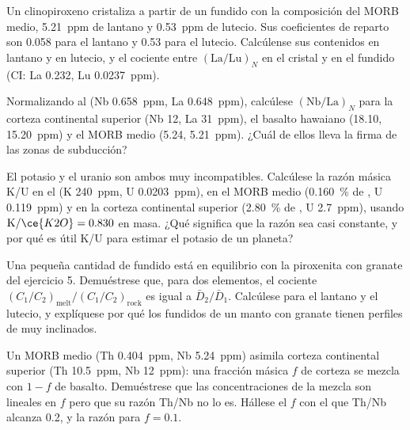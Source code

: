 \begin{exercise}[$\star\star$]\label{exo:b2:elements-in-the-earth:7}
Un clinopiroxeno cristaliza a partir de un fundido con la composición del MORB medio,
\qty{5.21}{ppm} de lantano y \qty{0.53}{ppm} de lutecio. Sus coeficientes de reparto
son 0.058 para el lantano y 0.53 para el lutecio. Calcúlense sus
contenidos en lantano y en lutecio, y el cociente entre $(\mathrm{La}/\mathrm{Lu})_N$
en el cristal y en el fundido (CI: La 0.232, Lu \qty{0.0237}{ppm}).
\end{exercise}

\begin{exercise}[$\star\star$]\label{exo:b2:elements-in-the-earth:8}
Normalizando al  (Nb \qty{0.658}{ppm}, La \qty{0.648}{ppm}),
calcúlese $(\mathrm{Nb}/\mathrm{La})_N$ para la corteza continental superior (Nb 12,
La \qty{31}{ppm}), el basalto hawaiano (18.10, \qty{15.20}{ppm}) y el MORB medio
(5.24, \qty{5.21}{ppm}). ¿Cuál de ellos lleva la firma de las zonas de subducción?
\end{exercise}

\begin{exercise}[$\star\star$]\label{exo:b2:elements-in-the-earth:9}
El potasio y el uranio son ambos muy incompatibles. Calcúlese la razón másica K/U en
el  (K \qty{240}{ppm}, U \qty{0.0203}{ppm}), en el MORB medio
(\qty{0.160}{\percent} de , U \qty{0.119}{ppm}) y en la corteza continental
superior (\qty{2.80}{\percent} de , U \qty{2.7}{ppm}), usando
$\mathrm{K}/\ce{K2O} = 0.830$ en masa. ¿Qué significa que la razón sea casi constante,
y por qué es útil K/U para estimar el potasio de un planeta?
\end{exercise}

\begin{exercise}[$\star\star\star$]\label{exo:b2:elements-in-the-earth:10}
Una pequeña cantidad de fundido está en equilibrio con la piroxenita con granate del ejercicio
5. Demuéstrese que, para dos elementos, el cociente
$(C_1/C_2)_{\mathrm{melt}}/(C_1/C_2)_{\mathrm{rock}}$ es igual a
$\bar D_2/\bar D_1$. Calcúlese para el lantano y el lutecio, y explíquese por qué los
fundidos de un manto con granate tienen perfiles de  muy inclinados.
\end{exercise}

\begin{exercise}[$\star\star\star$]\label{exo:b2:elements-in-the-earth:11}
Un MORB medio (Th \qty{0.404}{ppm}, Nb \qty{5.24}{ppm}) asimila corteza continental
superior (Th \qty{10.5}{ppm}, Nb \qty{12}{ppm}): una fracción másica $f$ de
corteza se mezcla con $1-f$ de basalto. Demuéstrese que las concentraciones de la mezcla son
lineales en $f$ pero que su razón Th/Nb no lo es. Hállese el $f$ con el que Th/Nb alcanza
0.2, y la razón para $f = 0.1$.
\end{exercise}

